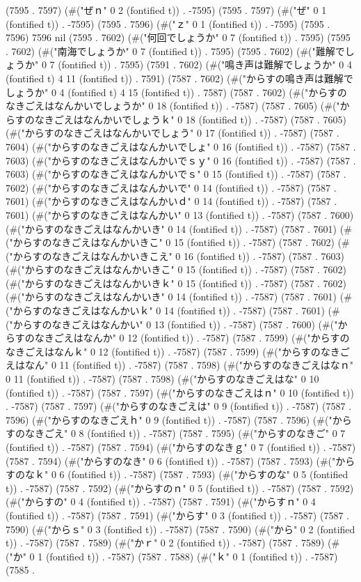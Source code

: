 (7595 . 7597) (#("ぜｎ" 0 2 (fontified t)) . -7595) (7595 . 7597) (#("ぜ" 0 1 (fontified t)) . -7595) (7595 . 7596) (#("ｚ" 0 1 (fontified t)) . -7595) (7595 . 7596) 7596 nil (7595 . 7602) (#("何回でしょうか" 0 7 (fontified t)) . 7595) (7595 . 7602) (#("南海でしょうか" 0 7 (fontified t)) . 7595) (7595 . 7602) (#("難解でしょうか" 0 7 (fontified t)) . 7595) (7591 . 7602) (#("鳴き声は難解でしょうか" 0 4 (fontified t) 4 11 (fontified t)) . 7591) (7587 . 7602) (#("からすの鳴き声は難解でしょうか" 0 4 (fontified t) 4 15 (fontified t)) . 7587) (7587 . 7602) (#("からすのなきごえはなんかいでしょうか" 0 18 (fontified t)) . -7587) (7587 . 7605) (#("からすのなきごえはなんかいでしょうｋ" 0 18 (fontified t)) . -7587) (7587 . 7605) (#("からすのなきごえはなんかいでしょう" 0 17 (fontified t)) . -7587) (7587 . 7604) (#("からすのなきごえはなんかいでしょ" 0 16 (fontified t)) . -7587) (7587 . 7603) (#("からすのなきごえはなんかいでｓｙ" 0 16 (fontified t)) . -7587) (7587 . 7603) (#("からすのなきごえはなんかいでｓ" 0 15 (fontified t)) . -7587) (7587 . 7602) (#("からすのなきごえはなんかいで" 0 14 (fontified t)) . -7587) (7587 . 7601) (#("からすのなきごえはなんかいｄ" 0 14 (fontified t)) . -7587) (7587 . 7601) (#("からすのなきごえはなんかい" 0 13 (fontified t)) . -7587) (7587 . 7600) (#("からすのなきごえはなんかいき" 0 14 (fontified t)) . -7587) (7587 . 7601) (#("からすのなきごえはなんかいきこ" 0 15 (fontified t)) . -7587) (7587 . 7602) (#("からすのなきごえはなんかいきこえ" 0 16 (fontified t)) . -7587) (7587 . 7603) (#("からすのなきごえはなんかいきこ" 0 15 (fontified t)) . -7587) (7587 . 7602) (#("からすのなきごえはなんかいきｋ" 0 15 (fontified t)) . -7587) (7587 . 7602) (#("からすのなきごえはなんかいき" 0 14 (fontified t)) . -7587) (7587 . 7601) (#("からすのなきごえはなんかいｋ" 0 14 (fontified t)) . -7587) (7587 . 7601) (#("からすのなきごえはなんかい" 0 13 (fontified t)) . -7587) (7587 . 7600) (#("からすのなきごえはなんか" 0 12 (fontified t)) . -7587) (7587 . 7599) (#("からすのなきごえはなんｋ" 0 12 (fontified t)) . -7587) (7587 . 7599) (#("からすのなきごえはなん" 0 11 (fontified t)) . -7587) (7587 . 7598) (#("からすのなきごえはなｎ" 0 11 (fontified t)) . -7587) (7587 . 7598) (#("からすのなきごえはな" 0 10 (fontified t)) . -7587) (7587 . 7597) (#("からすのなきごえはｎ" 0 10 (fontified t)) . -7587) (7587 . 7597) (#("からすのなきごえは" 0 9 (fontified t)) . -7587) (7587 . 7596) (#("からすのなきごえｈ" 0 9 (fontified t)) . -7587) (7587 . 7596) (#("からすのなきごえ" 0 8 (fontified t)) . -7587) (7587 . 7595) (#("からすのなきご" 0 7 (fontified t)) . -7587) (7587 . 7594) (#("からすのなきｇ" 0 7 (fontified t)) . -7587) (7587 . 7594) (#("からすのなき" 0 6 (fontified t)) . -7587) (7587 . 7593) (#("からすのなｋ" 0 6 (fontified t)) . -7587) (7587 . 7593) (#("からすのな" 0 5 (fontified t)) . -7587) (7587 . 7592) (#("からすのｎ" 0 5 (fontified t)) . -7587) (7587 . 7592) (#("からすの" 0 4 (fontified t)) . -7587) (7587 . 7591) (#("からすｎ" 0 4 (fontified t)) . -7587) (7587 . 7591) (#("からす" 0 3 (fontified t)) . -7587) (7587 . 7590) (#("からｓ" 0 3 (fontified t)) . -7587) (7587 . 7590) (#("から" 0 2 (fontified t)) . -7587) (7587 . 7589) (#("かｒ" 0 2 (fontified t)) . -7587) (7587 . 7589) (#("か" 0 1 (fontified t)) . -7587) (7587 . 7588) (#("ｋ" 0 1 (fontified t)) . -7587) (7585 . 